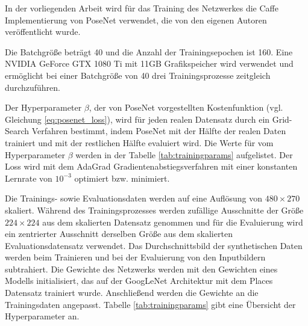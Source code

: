 In der vorliegenden Arbeit wird für das Training des Netzwerkes die Caffe \cite{jiaCaffeConvolutionalArchitecture2014} Implementierung von PoseNet verwendet, die von den eigenen Autoren \citet{kendallPoseNetConvolutionalNetwork2015} veröffentlicht wurde.

Die Batchgröße beträgt 40 und die Anzahl der Trainingsepochen ist 160. Eine NVIDIA GeForce GTX 1080 Ti mit 11GB Grafikspeicher wird verwendet und ermöglicht bei einer Batchgröße von 40 drei Trainingsprozesse zeitgleich durchzuführen.

Der Hyperparameter $\beta$, der von PoseNet vorgestellten Kostenfunktion (vgl. Gleichung \ref{eq:posenet_loss}), wird für jeden realen Datensatz durch ein Grid-Search Verfahren bestimmt, indem PoseNet mit der Hälfte der realen Daten trainiert und mit der restlichen Hälfte evaluiert wird. Die Werte für vom Hyperparameter $\beta$ werden in der Tabelle \ref{tab:trainingparams} aufgelistet. Der Loss wird mit dem AdaGrad \cite{duchiAdaptiveSubgradientMethods2011} Gradientenabstiegsverfahren mit einer konstanten Lernrate von $10^{-3}$ optimiert bzw. minimiert. 

Die Trainings- sowie Evaluationsdaten werden auf eine Auflösung von $480\times270$ skaliert. Während des Trainingsprozesses werden zufällige Ausschnitte der Größe $224 \times 224$ aus dem skalierten Datensatz genommen und für die Evaluierung wird ein zentrierter Ausschnitt derselben Größe aus dem skalierten Evaluationsdatensatz verwendet. Das Durchschnittsbild der synthetischen Daten werden beim Trainieren und bei der Evaluierung von den Inputbildern subtrahiert. 
Die Gewichte des Netzwerks werden mit den Gewichten eines Modells initialisiert, das auf der GoogLeNet Architektur mit dem Places Datensatz \cite{zhouLearningDeepFeatures2014} trainiert wurde. Anschließend werden die Gewichte an die Trainingsdaten angepasst. Tabelle \ref{tab:trainingparams} gibt eine Übersicht der Hyperparameter an.

